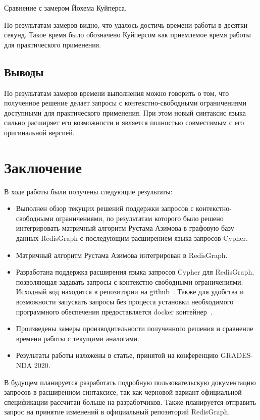 \begin{table}[h!]
\begin{adjustbox}{max width=\textwidth}

\end{adjustbox}
\caption{Сравнение с замером Йохема Куйперса.}
\label{tab:neo4j-vs-redisgraph}
\end{table}

По результатам замеров видно, что удалось достичь времени работы в десятки секунд. Такое время было обозначено Куйперсом как приемлемое время работы для практического применения.


\subsection{Выводы}
По результатам замеров времени выполнения можно говорить о том, что полученное решение делает запросы с контекстно-свободными ограничениями доступными для практического применения. При этом новый синтаксис языка сильно расширяет его возможности и является полностью совместимым с его оригинальной версией.

\section*{Заключение}
В ходе работы были получены следующие результаты:
\begin{itemize}
\item Выполнен обзор текущих решений поддержки запросов с кон\-текстно-свободными ограничениями, по результатам которого было решено интегрировать матричный алгоритм Рустама Азимова в графовую базу данных RedisGraph с последующим расширением языка запросов Cypher. 
\item Матричный алгоритм Рустама Азимова интегрирован в RedisGraph.
\item Разработана поддержка расширения языка запросов Cypher для RedisGraph, позволяющая задавать запросы с конте\-кстно-сво\-бод\-ными ограничениями. Исходный код находится в репозитории на github~\cite{github}. Также для удобства и возможности запускать запросы без процесса установки необходимого программного обеспечения предоставляется docker контейнер~\cite{docker}.
\item Произведены замеры производительности полученного решения и сравнение времени работы с текущими аналогами.
\item Результаты работы изложены в статье, принятой на конференцию GRADES-NDA 2020.
\end{itemize}

В будущем планируется разработать подробную пользовательскую документацию запросов в расширенном синтаксисе, так как черновой вариант официальной спецификации рассчитан больше на разработчиков. Также планируется отправить запрос на принятие изменений в официальный репозиторий RedisGraph. 

%
%
%
